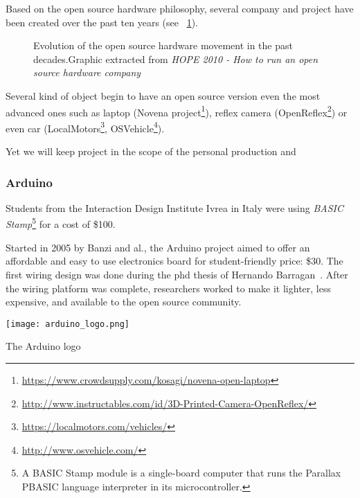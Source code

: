Based on the open source hardware philosophy, several company and project have been created over the past ten years (see \figurename~\ref{fig:oh_evolution}).

\begin{figure}[h]
\centering
    \hfil
    \caption{Evolution of the open source hardware movement in the past decades.Graphic extracted from \emph{HOPE 2010 - How to run an open source hardware company}}
    \label{fig:oh_evolution}
\end{figure}


Several kind of object begin to have an open source version even the most advanced ones such as laptop (Novena project\footnote{\url{https://www.crowdsupply.com/kosagi/novena-open-laptop}}), reflex camera (OpenReflex\footnote{\url{http://www.instructables.com/id/3D-Printed-Camera-OpenReflex/}}) or even car (LocalMotors\footnote{\url{https://localmotors.com/vehicles/}}, OSVehicle\footnote{\url{http://www.osvehicle.com/}}).

Yet we will keep project in the scope of the personal production and

\subsubsection{Arduino} %

Students from the Interaction Design Institute Ivrea in Italy were using \emph{BASIC Stamp}\footnote{A BASIC Stamp module is a single-board computer that runs the Parallax PBASIC language interpreter in its microcontroller.} for a cost of \$100.

\begin{row}{4}{2}
    \begin{cell}{3}
      Started in 2005 by Banzi and al., the Arduino project aimed to offer an affordable and easy to use electronics board for student-friendly price: \$30. The first wiring design was done during the phd thesis of Hernando Barragan~\cite{barragan2004wiring}. After the wiring platform was complete, researchers worked to make it lighter, less expensive, and available to the open source community.
    \end{cell}
    \begin{cell}{1}
        \begin{NFfigure}
            \centering
                \texttt{[image: arduino\_logo.png]}
            \caption{The Arduino logo}
            \label{fig:arduino_logo}
        \end{NFfigure}
    \end{cell}
\end{row}

